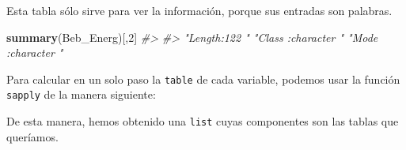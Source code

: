 \documentclass[
]{book}
\newenvironment{Shaded}{\begin{snugshade}}{\end{snugshade}}
\newcommand{\CommentTok}[1]{\textcolor[rgb]{0.56,0.35,0.01}{\textit{#1}}}
\newcommand{\DataTypeTok}[1]{\textcolor[rgb]{0.13,0.29,0.53}{#1}}
\newcommand{\DecValTok}[1]{\textcolor[rgb]{0.00,0.00,0.81}{#1}}
\newcommand{\KeywordTok}[1]{\textcolor[rgb]{0.13,0.29,0.53}{\textbf{#1}}}
\newcommand{\NormalTok}[1]{#1}
\newcommand{\OperatorTok}[1]{\textcolor[rgb]{0.81,0.36,0.00}{\textbf{#1}}}
\theoremstyle{definition}
\theoremstyle{definition}
\theoremstyle{definition}
\theoremstyle{remark}
\begin{document}
Esta tabla sólo sirve para ver la información, porque sus entradas son palabras.

\begin{Shaded}
\begin{Highlighting}[]
\KeywordTok{summary}\NormalTok{(Beb\_Energ)[,}\DecValTok{2}\NormalTok{]}
\CommentTok{\#\textgreater{}                                                                }
\CommentTok{\#\textgreater{} "Length:122        " "Class :character  " "Mode  :character  "}
\end{Highlighting}
\end{Shaded}

Para calcular en un solo paso la \texttt{table} de cada variable, podemos usar la función \texttt{sapply} de la manera siguiente:

\begin{Shaded}
\end{Shaded}

De esta manera, hemos obtenido una \texttt{list} cuyas componentes son las tablas que queríamos.

\begin{Shaded}
\end{Shaded}
\end{document}
